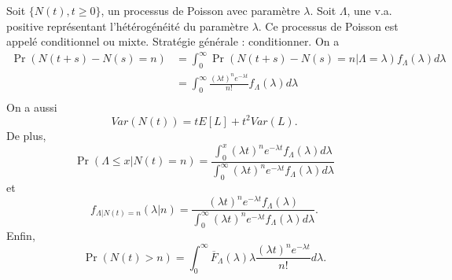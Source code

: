 Soit $\{N(t), t\geq 0\}$, un processus de Poisson avec paramètre $\lambda$. Soit $\Lambda$, une v.a. positive représentant l'hétérogénéité du paramètre $\lambda$. Ce processus de Poisson est appelé conditionnel ou mixte. Stratégie générale : conditionner. On a 
\begin{align*}
	\Pr(N(t + s) - N(s) = n) &= \int_{0}^{\infty}\Pr(N(t + s) - N(s) = n \vert \Lambda=\lambda) f_\Lambda(\lambda)d\lambda\\
	&= \int_{0}^{\infty}\frac{(\lambda t)^n e^{-\lambda t}}{n!} f_\Lambda(\lambda)d\lambda\\
\end{align*}
On a aussi 
$$Var(N(t)) = tE[L] + t^2Var(L).$$
De plus, 
$$\Pr(\Lambda \leq x \vert N(t) = n) = \frac{\int_{0}^{x}(\lambda t)^ne^{-\lambda t}f_\Lambda(\lambda) d\lambda }{\int_{0}^{\infty}(\lambda t)^ne^{-\lambda t}f_\Lambda(\lambda) d\lambda }$$
et
$$f_{\Lambda \vert N(t) = n}(\lambda \vert n) = \frac{(\lambda t)^ne^{-\lambda t}f_\Lambda(\lambda)}{\int_{0}^{\infty}(\lambda t)^ne^{-\lambda t}f_\Lambda(\lambda) d\lambda }.$$
Enfin, 
$$\Pr(N(t) > n) = \int_{0}^{\infty}\overline{F}_\Lambda(\lambda)\lambda \frac{(\lambda t)^n e^{-\lambda t}}{n!}d\lambda.$$












































































































